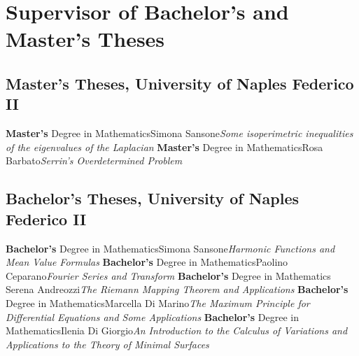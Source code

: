 \documentclass[11pt,a4paper,sans,colorlinks,linkcolor=green]{moderncv}
\begin{document}
\section{Supervisor of Bachelor's and Master's Theses}
\subsection{Master's Theses, University of Naples Federico II}
 {\textbf{Master's} Degree in Mathematics}{}{Simona Sansone}{\textit{Some isoperimetric inequalities of the eigenvalues of the Laplacian}}{}
 {\textbf{Master's} Degree in Mathematics}{}{Rosa Barbato}{\textit{Serrin's Overdetermined Problem}}{}
\subsection{Bachelor's Theses, University of Naples Federico II}
 {\textbf{Bachelor's} Degree in Mathematics}{}{Simona Sansone}{\textit{Harmonic Functions and Mean Value Formulas}}{}
 {\textbf{Bachelor's} Degree in Mathematics}{}{Paolino Ceparano}{\textit{Fourier Series and Transform}}{}
 {\textbf{Bachelor's} Degree in Mathematics}{}{ Serena Andreozzi}{\textit{The Riemann Mapping Theorem and Applications}}
{}
 {\textbf{Bachelor's} Degree in Mathematics}{}{Marcella Di Marino}{\textit{The Maximum Principle for Differential Equations and Some Applications}}{}
 {\textbf{Bachelor's} Degree in Mathematics}{}{Ilenia Di Giorgio}{\textit{An Introduction to the Calculus of Variations and Applications to the Theory of Minimal Surfaces}}{}

\end{document}
